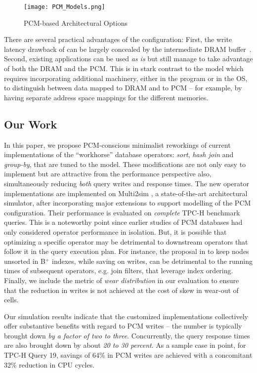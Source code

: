 \begin{figure}[t]
	\texttt{[image: PCM\_Models.png]}\centering
	\caption{PCM-based Architectural Options}
	\label{fig:pcm_models}
\end{figure}

There are several practical advantages of the \model{} configuration:
First, the write latency drawback of \modelPcmRam{} can be largely
concealed by the intermediate DRAM buffer~\cite{qureshi}. Second,
existing applications can be used \textit{as is} but still manage to take
advantage of both the DRAM and the PCM. This is in stark contrast to the
\modelExplicit{} model which requires incorporating additional machinery,
either in the program or in the OS, to distinguish between data mapped
to DRAM and to PCM -- for example, by having separate address space
mappings for the different memories.

\subsection*{Our Work}
In this paper, we propose PCM-conscious minimalist reworkings of current
implementations of the ``workhorse'' database operators: \textit{sort},
\textit{hash join} and \textit{group-by}, that are tuned to the \model{}
model.  
These modifications are not only easy to implement but are attractive from the performance perspective also, simultaneously reducing
\emph{both} query writes and response times.
The new operator implementations are implemented on Multi2sim
\cite{multi2sim}, a state-of-the-art architectural simulator, after
incorporating major extensions to support modelling of the \model{}
PCM configuration.  Their performance is evaluated on \emph{complete}
TPC-H benchmark queries. This is a noteworthy point since earlier studies
of PCM databases had only considered operator performance in isolation.
But, it is possible that optimizing a specific operator may be detrimental
to downstream operators that follow it in the query execution plan. For
instance, the proposal in \cite{chen} to keep nodes unsorted in B$^+$
indexes, while saving on writes, can be detrimental to the running
times of subsequent operators, e.g. join filters, that leverage index
ordering.  Finally, we include the metric of \emph{wear distribution}
in our evaluation to ensure that the reduction in writes is not achieved
at the cost of skew in wear-out of cells.

Our simulation results indicate that the customized implementations
collectively offer substantive benefits with regard to PCM writes --
the number is typically brought down \emph{by a factor of two to three}.
Concurrently, the query response times are also brought down by about
\emph{20 to 30 percent}. As a sample case in point, for TPC-H Query 19,
savings of 64\% in PCM writes are achieved with a concomitant 32\%
reduction in CPU cycles. 

